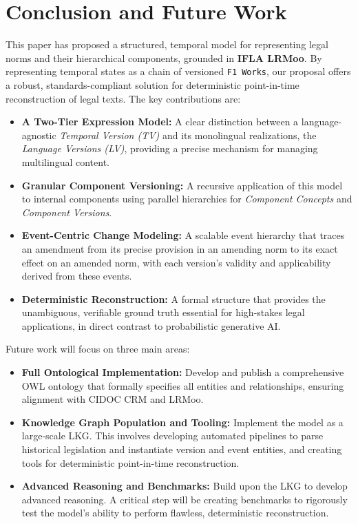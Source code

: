 \documentclass[11pt]{article}
\begin{document}
\section{Conclusion and Future Work}
\label{sec:conclusion_future_work}
This paper has proposed a structured, temporal model for representing legal norms and their hierarchical components, grounded in \textbf{IFLA LRMoo}. By representing temporal states as a chain of versioned \texttt{F1 Works}, our proposal offers a robust, standards-compliant solution for deterministic point-in-time reconstruction of legal texts. The key contributions are:
\begin{itemize}
    \item \textbf{A Two-Tier Expression Model:} A clear distinction between a language-agnostic \emph{Temporal Version (TV)} and its monolingual realizations, the \emph{Language Versions (LV)}, providing a precise mechanism for managing multilingual content.
    \item \textbf{Granular Component Versioning:} A recursive application of this model to internal components using parallel hierarchies for \emph{Component Concepts} and \emph{Component Versions}.
    \item \textbf{Event-Centric Change Modeling:} A scalable event hierarchy that traces an amendment from its precise provision in an amending norm to its exact effect on an amended norm, with each version's validity and applicability derived from these events.
    \item \textbf{Deterministic Reconstruction:} A formal structure that provides the unambiguous, verifiable ground truth essential for high-stakes legal applications, in direct contrast to probabilistic generative AI.
\end{itemize}

Future work will focus on three main areas:
\begin{itemize}
    \item \textbf{Full Ontological Implementation:} Develop and publish a comprehensive OWL ontology that formally specifies all entities and relationships, ensuring alignment with CIDOC CRM and LRMoo.
    \item \textbf{Knowledge Graph Population and Tooling:} Implement the model as a large-scale LKG. This involves developing automated pipelines to parse historical legislation and instantiate version and event entities, and creating tools for deterministic point-in-time reconstruction.
    \item \textbf{Advanced Reasoning and Benchmarks:} Build upon the LKG to develop advanced reasoning. A critical step will be creating benchmarks to rigorously test the model's ability to perform flawless, deterministic reconstruction.
\end{itemize}
\end{document}
